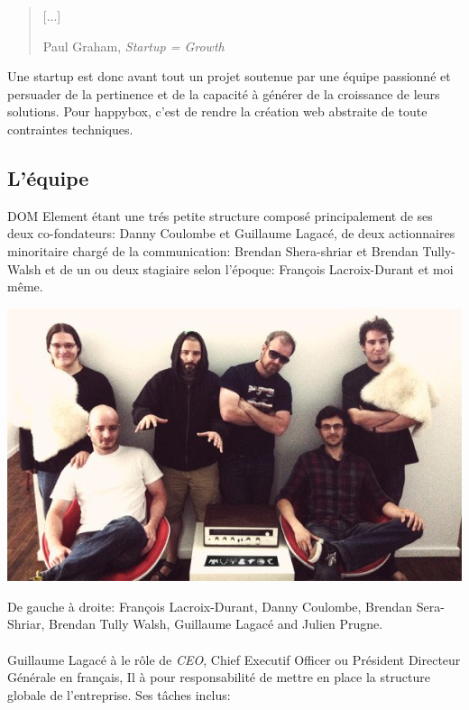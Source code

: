 \documentclass[11pt, a4paper ]{article}
\begin{document}
\begin{spacing}{1.5}
\begin{quote}
	[...]


	\caption{Paul Graham, \emph{Startup = Growth\cite{startupGrowth}}}
\end{quote}

Une startup est donc avant tout un projet soutenue par une équipe passionné et persuader de la pertinence et de la capacité à générer de la croissance de leurs solutions. Pour happybox, c'est de rendre la création web abstraite de toute contraintes techniques.

		\subsection{L'équipe} %
DOM Element étant une trés petite structure composé principalement de ses deux co-fondateurs: Danny Coulombe et Guillaume Lagacé, de deux actionnaires minoritaire chargé de la communication: Brendan Shera-shriar et Brendan Tully-Walsh et de un ou deux stagiaire selon l'époque: François Lacroix-Durant et moi même.

\begin{center}
	\includegraphics[width=\textwidth]{images/team/team.jpg}

	 De gauche à droite: François Lacroix-Durant, Danny Coulombe, Brendan Sera-Shriar, Brendan Tully Walsh, Guillaume Lagacé and Julien Prugne.
\end{center}

\paragraph{}
	Guillaume Lagacé à le rôle de \emph{CEO}, Chief Executif Officer ou Président Directeur Générale en français, Il à pour responsabilité de mettre en place la structure globale de l'entreprise.
	Ses tâches inclus:


\end{spacing}
\end{document}
